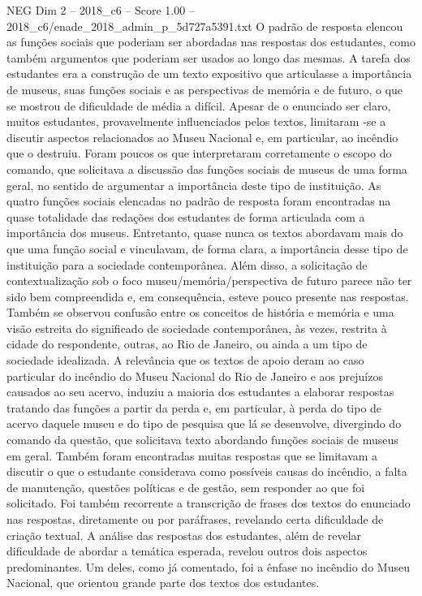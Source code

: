 \begin{textsample}{NEG Dim 2 – 2018\_c6 – Score 1.00 – 2018\_c6/enade\_2018\_admin\_p\_5d727a5391.txt}
O padrão de resposta elencou as funções sociais que poderiam ser abordadas nas respostas dos estudantes, como também argumentos que poderiam ser usados ao longo das mesmas.
A tarefa dos estudantes era a construção de um texto expositivo que articulasse a importância de museus, suas funções sociais e as perspectivas de memória e de futuro, o que se mostrou de dificuldade de média a difícil.
Apesar de o enunciado ser claro, muitos estudantes, provavelmente influenciados pelos textos, limitaram -se a discutir aspectos relacionados ao Museu Nacional e, em particular, ao incêndio que o destruiu.
Foram poucos os que interpretaram corretamente o escopo do comando, que solicitava a discussão das funções sociais de museus de uma forma geral, no sentido de argumentar a importância deste tipo de instituição.
As quatro funções sociais elencadas no padrão de resposta foram encontradas na quase totalidade das redações dos estudantes de forma articulada com a importância dos museus.
Entretanto, quase nunca os textos abordavam mais do que uma função social e vinculavam, de forma clara, a importância desse tipo de instituição para a sociedade contemporânea.
Além disso, a solicitação de contextualização sob o foco museu/memória/perspectiva de futuro parece não ter sido bem compreendida e, em consequência, esteve pouco presente nas respostas.
Também se observou confusão entre os conceitos de história e memória e uma visão estreita do significado de sociedade contemporânea, às vezes, restrita à cidade do respondente, outras, ao Rio de Janeiro, ou ainda a um tipo de sociedade idealizada.
A relevância que os textos de apoio deram ao caso particular do incêndio do Museu Nacional do Rio de Janeiro e aos prejuízos causados ao seu acervo, induziu a maioria dos estudantes a elaborar respostas tratando das funções a partir da perda e, em particular, à perda do tipo de acervo daquele museu e do tipo de pesquisa que lá se desenvolve, divergindo do comando da questão, que solicitava texto abordando funções sociais de museus em geral.
Também foram encontradas muitas respostas que se limitavam a discutir o que o estudante considerava como possíveis causas do incêndio, a falta de manutenção, questões políticas e de gestão, sem responder ao que foi solicitado.
Foi também recorrente a transcrição de frases dos textos do enunciado nas respostas, diretamente ou por paráfrases, revelando certa dificuldade de criação textual.
A análise das respostas dos estudantes, além de revelar dificuldade de abordar a temática esperada, revelou outros dois aspectos predominantes.
Um deles, como já comentado, foi a ênfase no incêndio do Museu Nacional, que orientou grande parte dos textos dos estudantes.

\end{textsample}
